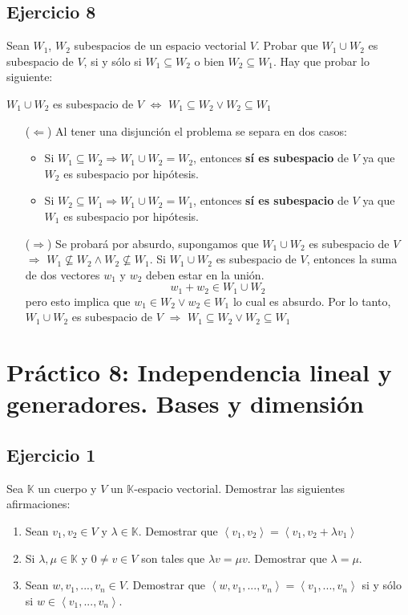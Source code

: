\documentclass[a4paper,12pt]{article}
\begin{document}
\subsection{Ejercicio 8}
Sean $W_1$, $W_2$ subespacios de un espacio vectorial $V$. Probar que $W_1\cup W_2$ es subespacio de $V$, si y sólo si $W_1\subseteq W_2$ o bien $W_2 \subseteq W_1$. \newline
Hay que probar lo siguiente:
\begin{center}
    $W_1\cup W_2$ es subespacio de $V$ $\Leftrightarrow$ $W_1\subseteq W_2 \vee W_2 \subseteq W_1$
\end{center}
\begin{itemize}
    \item[($\Leftarrow$)] Al tener una disjunción el problema se separa en dos casos:
    \begin{itemize}
        \item Si $W_1\subseteq W_2 \Rightarrow W_1\cup W_2 = W_2$, entonces \textbf{sí es subespacio} de $V$ ya que $W_2$ es subespacio por hipótesis.
        \item Si $W_2\subseteq W_1 \Rightarrow W_1\cup W_2 = W_1$, entonces \textbf{sí es subespacio} de $V$ ya que $W_1$ es subespacio por hipótesis.
    \end{itemize}
    \item[($\Rightarrow$)] Se probará por absurdo, supongamos que $W_1\cup W_2$  es subespacio de $V$ $\Rightarrow$ $W_1 \nsubseteq W_2 \wedge W_2 \nsubseteq W_1$. Si $W_1 \cup W_2$ es subespacio de $V$, entonces la suma de dos vectores $w_1$ y $w_2$ deben estar en la unión. $$w_1+w_2\in W_1 \cup W_2$$ pero esto implica que $w_1\in W_2 \vee w_2 \in W_1$ lo cual es absurdo. Por lo tanto, $W_1\cup W_2$  es subespacio de $V$ $\Rightarrow$ $W_1\subseteq W_2 \vee W_2 \subseteq W_1$ 
\end{itemize}
\section{Práctico 8: Independencia lineal y generadores. Bases y dimensión}
\subsection{Ejercicio 1}
Sea $\mathds{K}$ un cuerpo y $V$ un $\mathds{K}$-espacio vectorial. Demostrar las siguientes afirmaciones:
\begin{enumerate}
    \item Sean $v_1,v_2\in V$ y $\lambda\in\mathds{K}$. Demostrar que $\left \langle v_1,v_2 \right \rangle =\left \langle v_1,v_2 + \lambda v_1 \right \rangle$
    \item Si $\lambda,\mu\in\mathds{K}$ y $0\neq v\in V$ son tales que $\lambda v= \mu v$. Demostrar que $\lambda=\mu$.
    \item Sean $w,v_1,...,v_n \in V$. Demostrar que $\left \langle w,v_1,...,v_n \right \rangle = \left \langle v_1,...,v_n \right \rangle$ si y sólo si $w\in \left \langle v_1,...,v_n \right \rangle$.
\end{enumerate}
\end{document}
